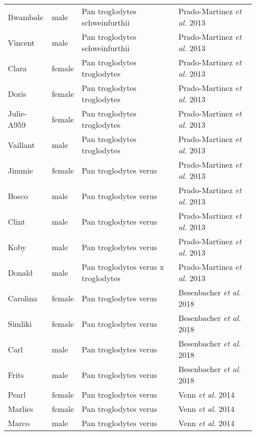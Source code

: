 \begin{table}[h]
\begin{tabular}{|l|l|l|l|}
Bwambale  &  male  &  Pan troglodytes schweinfurthii  & Prado-Martinez \textit{et al.} 2013 \cite{pradomartinezgagp}  \\
Vincent  &  male  &  Pan troglodytes schweinfurthii  & Prado-Martinez \textit{et al.} 2013 \cite{pradomartinezgagp}  \\
Clara  &  female  &  Pan troglodytes troglodytes  & Prado-Martinez \textit{et al.} 2013 \cite{pradomartinezgagp}  \\
Doris  &  female  &  Pan troglodytes troglodytes  & Prado-Martinez \textit{et al.} 2013 \cite{pradomartinezgagp}  \\
Julie-A959  &  female  &  Pan troglodytes troglodytes  & Prado-Martinez \textit{et al.} 2013 \cite{pradomartinezgagp}  \\
Vaillant  &  male  &  Pan troglodytes troglodytes  & Prado-Martinez \textit{et al.} 2013 \cite{pradomartinezgagp}  \\
Jimmie  &  female  &  Pan troglodytes verus  & Prado-Martinez \textit{et al.} 2013 \cite{pradomartinezgagp}  \\
Bosco  &  male  &  Pan troglodytes verus  & Prado-Martinez \textit{et al.} 2013 \cite{pradomartinezgagp}  \\
Clint  &  male  &  Pan troglodytes verus  & Prado-Martinez \textit{et al.} 2013 \cite{pradomartinezgagp}  \\
Koby  &  male  &  Pan troglodytes verus  & Prado-Martinez \textit{et al.} 2013 \cite{pradomartinezgagp}  \\
Donald  &  male  &  Pan troglodytes verus x troglodytes & Prado-Martinez \textit{et al.} 2013 \cite{pradomartinezgagp}  \\
Carolina  &  female  &  Pan troglodytes verus  & Besenbacher \textit{et al.} 2018 \cite{Besenbacher2018DirectEO}\\
Simliki  &  female  &  Pan troglodytes verus  & Besenbacher \textit{et al.} 2018 \cite{Besenbacher2018DirectEO}  \\
Carl  &  male  &  Pan troglodytes verus  & Besenbacher \textit{et al.} 2018 \cite{Besenbacher2018DirectEO}  \\
Frits  &  male  &  Pan troglodytes verus  & Besenbacher \textit{et al.} 2018 \cite{Besenbacher2018DirectEO}  \\
Pearl  &  female  &  Pan troglodytes verus  & Venn \textit{et al.} 2014\cite{Venn1272} \\
Marlies  &  female  &  Pan troglodytes verus  & Venn \textit{et al.} 2014\cite{Venn1272}  \\
Marco  &  male  &  Pan troglodytes verus  & Venn \textit{et al.} 2014\cite{Venn1272}  \\

\end{tabular}
\end{table}
